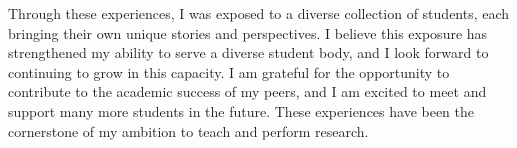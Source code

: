 \documentclass[12pt]{article}
\begin{document}
Through these experiences, I was exposed to a diverse collection of students, each bringing their own unique stories and perspectives.  I
believe this exposure has strengthened my ability to serve a diverse student body, and I look forward to continuing to grow in this
capacity. I am grateful for the opportunity to contribute to the academic success of my peers, and I am excited to meet and support many
more students in the future.  These experiences have been the cornerstone of my ambition to teach and perform research.
\end{document}
